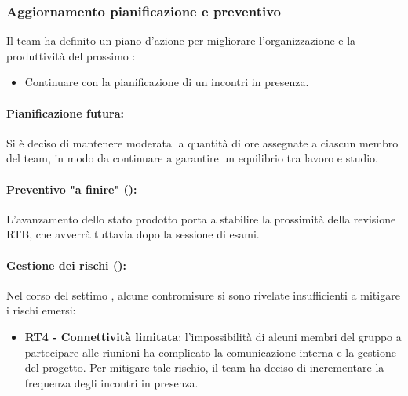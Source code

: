 \subsubsection{Aggiornamento pianificazione e preventivo}
\par Il team ha definito un piano d'azione per migliorare l'organizzazione e la produttività del prossimo :
\begin{itemize}
  \item Continuare con la pianificazione di un incontri in presenza.
\end{itemize}

\paragraph*{Pianificazione futura:}
\par Si è deciso di mantenere moderata la quantità di ore assegnate a ciascun membro del team, in modo da continuare a garantire un equilibrio tra lavoro e studio.

\paragraph*{Preventivo "a finire" ():}
\par L'avanzamento dello stato prodotto porta a stabilire la prossimità della revisione RTB, che avverrà tuttavia dopo la sessione di esami.

\paragraph*{Gestione dei rischi ():}
\par Nel corso del settimo , alcune contromisure si sono rivelate insufficienti a mitigare i rischi emersi:
\begin{itemize}
  \item \textbf{RT4 - Connettività limitata}: l'impossibilità di alcuni membri del gruppo a partecipare alle riunioni ha complicato la comunicazione interna e la gestione del progetto. Per mitigare tale rischio, il team ha deciso di incrementare la frequenza degli incontri in presenza.
\end{itemize}

